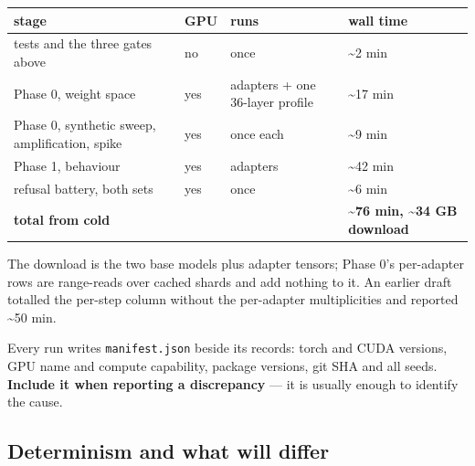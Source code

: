\begin{table}[t]
\centering\footnotesize
\begin{tabularx}{\textwidth}{>{\hsize=1.340\hsize\raggedright\arraybackslash}Xl>{\hsize=0.961\hsize\raggedright\arraybackslash}X>{\hsize=0.699\hsize\raggedright\arraybackslash}X}
\toprule
stage & GPU & runs & wall time \\
\midrule
tests and the three gates above & no & once & \textasciitilde{}2 min \\
Phase 0, weight space & yes & 9 adapters + one 36-layer profile & \textasciitilde{}17 min \\
Phase 0, synthetic sweep, amplification, spike & yes & once each & \textasciitilde{}9 min \\
Phase 1, behaviour & yes & 6 adapters & \textasciitilde{}42 min \\
refusal battery, both sets & yes & once & \textasciitilde{}6 min \\
\textbf{total from cold} &  &  & \textbf{\textasciitilde{}76 min, \textasciitilde{}34 GB download} \\
\bottomrule
\end{tabularx}
\end{table}

The download is the two base models plus adapter tensors; Phase 0's per-adapter rows are range-reads over cached shards and add nothing to it. An earlier draft totalled the per-step column without the per-adapter multiplicities and reported \textasciitilde{}50 min.

Every run writes \texttt{manifest.\allowbreak{}json} beside its records: torch and CUDA versions, GPU name and compute capability, package versions, git SHA and all seeds. \textbf{Include it when reporting a discrepancy} --- it is usually enough to identify the cause.

\subsection{Determinism and what will differ}

